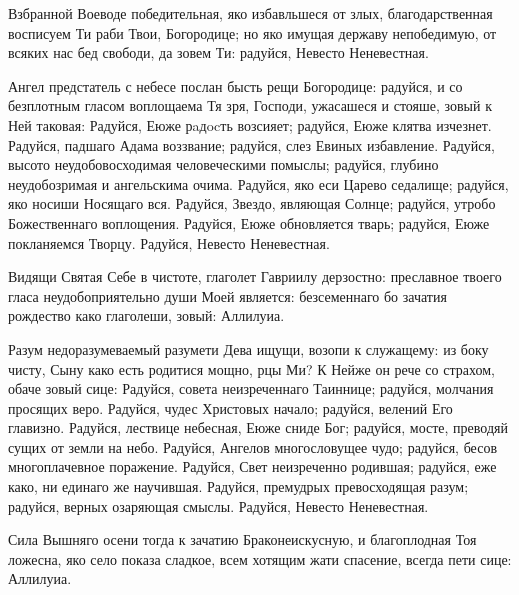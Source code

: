 \begin{mymulticols}



Взбранной Воеводе победительная, яко избавльшеся от злых, благодарственная восписуем Ти раби Твои, Богородице; но яко имущая державу непобедимую, от всяких нас бед свободи, да зовем Ти: радуйся, Невесто Неневестная.


Ангел предстатель с небесе послан бысть рещи Богородице: радуйся, и со безплотным гласом воплощаема Тя зря, Господи, ужасашеся и стояше, зовый к Ней таковая: Радуйся, Еюже рaдocть возсияет; радуйся, Еюже клятва изчезнет. Радуйся, падшаго Адама воззвание; радуйся, слез Евиных избавление. Радуйся, высото неудобовосходимая человеческими помыслы; радуйся, глубино неудобозримая и ангельскима очима. Радуйся, яко еси Царево седалище; радуйся, яко носиши Носящаго вся. Радуйся, Звездо, являющая Солнце; радуйся, утробо Божественнаго воплощения. Радуйся, Еюже обновляется тварь; радуйся, Еюже покланяемся Творцу. Радуйся, Невесто Неневестная.


Видящи Святая Себе в чистоте, глаголет Гавриилу дерзостно: преславное твоего гласа неудобоприятельно души Моей является: безсеменнаго бо зачатия рождество како глаголеши, зовый: Аллилуиа.


Разум недоразумеваемый разумети Дева ищущи, возопи к служащему: из боку чисту, Сыну како есть родитися мощно, рцы Ми? К Нейже он рече со страхом, обаче зовый сице: Радуйся, совета неизреченнаго Таиннице; радуйся, молчания просящих веро. Радуйся, чудес Христовых начало; радуйся, велений Его главизно. Радуйся, лествице небесная, Еюже сниде Бог; радуйся, мосте, преводяй сущих от земли на небо. Радуйся, Ангелов многословущее чудо; радуйся, бесов многоплачевное поражение. Радуйся, Свет неизреченно родившая; радуйся, еже како, ни единаго же научившая. Радуйся, премудрых превосходящая разум; радуйся, верных озаряющая смыслы. Радуйся, Невесто Неневестная.


Сила Вышняго осени тогда к зачатию Браконеискусную, и благоплодная Тоя ложесна, яко село показа сладкое, всем хотящим жати спасение, всегда пети сице: Аллилуиа.


\end{mymulticols}
